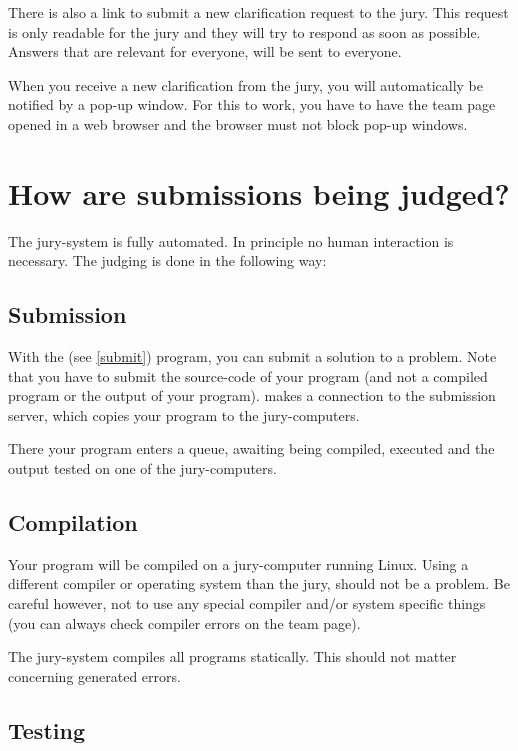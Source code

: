 There is also a link to submit a new clarification request to the
jury. This request is only readable for the jury and they will
try to respond as soon as possible. Answers that are relevant for
everyone, will be sent to everyone.

When you receive a new clarification from the jury, you will
automatically be notified by a pop-up window. For this to work, you
have to have the team page opened in a web browser and the browser must
not block pop-up windows.

\section{How are submissions being judged?}

The \DOMjudge jury-system is fully automated. In principle no human
interaction is necessary. The judging is done in the following way:

\subsection{Submission}

With the  (see \ref{submit}) program, you can submit a
solution to a problem. Note that you have to submit the source-code of
your program (and not a compiled program or the output of your
program).  makes a connection to the submission server,
which copies your program to the jury-computers.

There your program enters a queue, awaiting being compiled, executed
and the output tested on one of the jury-computers.

\subsection{Compilation}

Your program will be compiled on a jury-computer running Linux.
Using a different compiler or operating system than the jury, should
not be a problem. Be careful however, not to use any special compiler
and/or system specific things (you can always check compiler errors on
the team page).

The jury-system compiles all programs statically. This should not
matter concerning generated errors.

\subsection{Testing}

